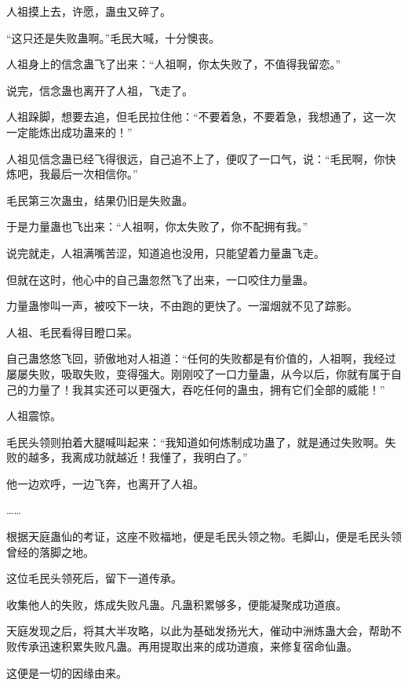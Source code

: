\begin{this_body}
人祖摸上去，许愿，蛊虫又碎了。

“这只还是失败蛊啊。”毛民大喊，十分懊丧。

人祖身上的信念蛊飞了出来：“人祖啊，你太失败了，不值得我留恋。”

说完，信念蛊也离开了人祖，飞走了。

人祖跺脚，想要去追，但毛民拉住他：“不要着急，不要着急，我想通了，这一次一定能炼出成功蛊来的！”

人祖见信念蛊已经飞得很远，自己追不上了，便叹了一口气，说：“毛民啊，你快炼吧，我最后一次相信你。”

毛民第三次蛊虫，结果仍旧是失败蛊。

于是力量蛊也飞出来：“人祖啊，你太失败了，你不配拥有我。”

说完就走，人祖满嘴苦涩，知道追也没用，只能望着力量蛊飞走。

但就在这时，他心中的自己蛊忽然飞了出来，一口咬住力量蛊。

力量蛊惨叫一声，被咬下一块，不由跑的更快了。一溜烟就不见了踪影。

人祖、毛民看得目瞪口呆。

自己蛊悠悠飞回，骄傲地对人祖道：“任何的失败都是有价值的，人祖啊，我经过屡屡失败，吸取失败，变得强大。刚刚咬了一口力量蛊，从今以后，你就有属于自己的力量了！我其实还可以更强大，吞吃任何的蛊虫，拥有它们全部的威能！”

人祖震惊。

毛民头领则拍着大腿喊叫起来：“我知道如何炼制成功蛊了，就是通过失败啊。失败的越多，我离成功就越近！我懂了，我明白了。”

他一边欢呼，一边飞奔，也离开了人祖。

……

根据天庭蛊仙的考证，这座不败福地，便是毛民头领之物。毛脚山，便是毛民头领曾经的落脚之地。

这位毛民头领死后，留下一道传承。

收集他人的失败，炼成失败凡蛊。凡蛊积累够多，便能凝聚成功道痕。

天庭发现之后，将其大半攻略，以此为基础发扬光大，催动中洲炼蛊大会，帮助不败传承迅速积累失败凡蛊。再用提取出来的成功道痕，来修复宿命仙蛊。

这便是一切的因缘由来。

\end{this_body}


